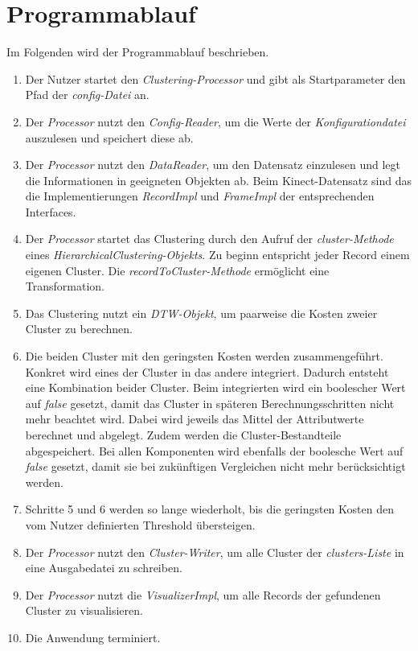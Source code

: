 \section{Programmablauf}
\label{4-Programmablauf}
Im Folgenden wird der Programmablauf beschrieben.
\begin{enumerate}
    \item Der Nutzer startet den \emph{Clustering-Processor}
    und gibt als Startparameter den Pfad der \emph{config-Datei} an.
    \item Der \emph{Processor} nutzt den \emph{Config-Reader}, um die Werte der \emph{Konfigurationdatei} auszulesen
    und speichert diese ab.
    \item Der \emph{Processor} nutzt den \emph{DataReader}, um den Datensatz einzulesen
    und legt die Informationen in geeigneten Objekten ab.
    Beim Kinect-Datensatz sind das die Implementierungen \emph{RecordImpl} und \emph{FrameImpl}
    der entsprechenden Interfaces.
    \item Der \emph{Processor} startet das Clustering durch den Aufruf der \emph{cluster-Methode}
    eines \emph{HierarchicalClustering-Objekts}.
    Zu beginn entspricht jeder Record einem eigenen Cluster.
    Die \emph{recordToCluster-Methode} ermöglicht eine Transformation.
    \item Das Clustering nutzt ein \emph{\ac{DTW}-Objekt},
    um paarweise die Kosten zweier Cluster zu berechnen.
    \item Die beiden Cluster mit den geringsten Kosten werden zusammengeführt.
    Konkret wird eines der Cluster in das andere integriert.
    Dadurch entsteht eine Kombination beider Cluster.
    Beim integrierten wird ein boolescher Wert auf \emph{false} gesetzt,
    damit das Cluster in späteren Berechnungsschritten nicht mehr beachtet wird.
    Dabei wird jeweils das Mittel der Attributwerte berechnet und abgelegt.
    Zudem werden die Cluster-Bestandteile abgespeichert.
    Bei allen Komponenten wird ebenfalls der boolesche Wert auf \emph{false} gesetzt,
    damit sie bei zukünftigen Vergleichen nicht mehr berücksichtigt werden.
    \item Schritte 5 und 6 werden so lange wiederholt, bis die geringsten Kosten den vom Nutzer definierten Threshold übersteigen.
    \item Der \emph{Processor} nutzt den \emph{Cluster-Writer}, um alle Cluster der \emph{clusters-Liste}
    in eine Ausgabedatei zu schreiben.
    \item Der \emph{Processor} nutzt die \emph{VisualizerImpl}, um alle Records der gefundenen Cluster zu visualisieren.
    \item Die Anwendung terminiert. 
\end{enumerate}

